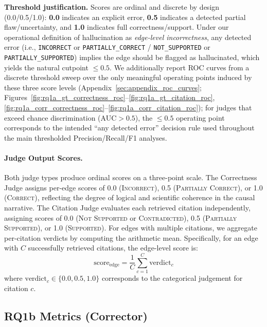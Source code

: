 \noindent\textbf{Threshold justification.} Scores are ordinal and discrete by design (0.0/0.5/1.0): \textbf{0.0} indicates an explicit error, \textbf{0.5} indicates a detected partial flaw/uncertainty, and \textbf{1.0} indicates full correctness/support. Under our operational definition of hallucination as \emph{edge-level incorrectness}, any detected error (i.e., \texttt{INCORRECT} or \texttt{PARTIALLY\_CORRECT} / \texttt{NOT\_SUPPORTED} or \texttt{PARTIALLY\_SUPPORTED}) implies the edge should be flagged as hallucinated, which yields the natural cutpoint \(\le 0.5\). We additionally report ROC curves from a discrete threshold sweep over the only meaningful operating points induced by these three score levels (Appendix~\ref{sec:appendix_roc_curves}; Figures~\ref{fig:rq1a_gt_correctness_roc}--\ref{fig:rq1a_gt_citation_roc}, \ref{fig:rq1a_corr_correctness_roc}--\ref{fig:rq1a_corr_citation_roc}); for judges that exceed chance discrimination (AUC$>0.5$), the \(\le 0.5\) operating point corresponds to the intended ``any detected error'' decision rule used throughout the main thresholded Precision/Recall/F1 analyses.

\paragraph{Judge Output Scores.}
Both judge types produce ordinal scores on a three-point scale. The Correctness Judge assigns per-edge scores of 0.0 (\textsc{Incorrect}), 0.5 (\textsc{Partially Correct}), or 1.0 (\textsc{Correct}), reflecting the degree of logical and scientific coherence in the causal narrative. The Citation Judge evaluates each retrieved citation independently, assigning scores of 0.0 (\textsc{Not Supported} or \textsc{Contradicted}), 0.5 (\textsc{Partially Supported}), or 1.0 (\textsc{Supported}). For edges with multiple citations, we aggregate per-citation verdicts by computing the arithmetic mean. Specifically, for an edge with $C$ successfully retrieved citations, the edge-level score is:
\begin{equation}
    \text{score}_{\text{edge}} = \frac{1}{C}\sum_{c=1}^{C} \text{verdict}_c
\end{equation}
where $\text{verdict}_c \in \{0.0, 0.5, 1.0\}$ corresponds to the categorical judgement for citation $c$.

\subsection{RQ1b Metrics (Corrector)}

